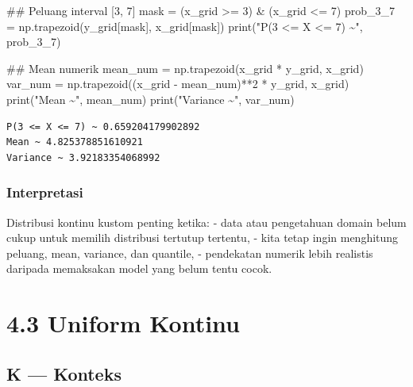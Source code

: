 \documentclass[
  letterpaper,
  DIV=11,
  numbers=noendperiod]{scrreprt}
\newenvironment{Shaded}{\begin{snugshade}}{\end{snugshade}}
\newcommand{\BuiltInTok}[1]{\textcolor[rgb]{0.00,0.23,0.31}{#1}}
\newcommand{\CommentTok}[1]{\textcolor[rgb]{0.37,0.37,0.37}{#1}}
\newcommand{\DecValTok}[1]{\textcolor[rgb]{0.68,0.00,0.00}{#1}}
\newcommand{\NormalTok}[1]{\textcolor[rgb]{0.00,0.23,0.31}{#1}}
\newcommand{\OperatorTok}[1]{\textcolor[rgb]{0.37,0.37,0.37}{#1}}
\newcommand{\StringTok}[1]{\textcolor[rgb]{0.13,0.47,0.30}{#1}}
\begin{document}
\begin{Shaded}
\begin{Highlighting}[]
\CommentTok{\#\# Peluang interval [3, 7]}
\NormalTok{mask }\OperatorTok{=}\NormalTok{ (x\_grid }\OperatorTok{\textgreater{}=} \DecValTok{3}\NormalTok{) }\OperatorTok{\&}\NormalTok{ (x\_grid }\OperatorTok{\textless{}=} \DecValTok{7}\NormalTok{)}
\NormalTok{prob\_3\_7 }\OperatorTok{=}\NormalTok{ np.trapezoid(y\_grid[mask], x\_grid[mask])}
\BuiltInTok{print}\NormalTok{(}\StringTok{"P(3 \textless{}= X \textless{}= 7) \textasciitilde{}"}\NormalTok{, prob\_3\_7)}

\CommentTok{\#\# Mean numerik}
\NormalTok{mean\_num }\OperatorTok{=}\NormalTok{ np.trapezoid(x\_grid }\OperatorTok{*}\NormalTok{ y\_grid, x\_grid)}
\NormalTok{var\_num }\OperatorTok{=}\NormalTok{ np.trapezoid((x\_grid }\OperatorTok{{-}}\NormalTok{ mean\_num)}\OperatorTok{**}\DecValTok{2} \OperatorTok{*}\NormalTok{ y\_grid, x\_grid)}
\BuiltInTok{print}\NormalTok{(}\StringTok{"Mean \textasciitilde{}"}\NormalTok{, mean\_num)}
\BuiltInTok{print}\NormalTok{(}\StringTok{"Variance \textasciitilde{}"}\NormalTok{, var\_num)}
\end{Highlighting}
\end{Shaded}

\begin{verbatim}
P(3 <= X <= 7) ~ 0.659204179902892
Mean ~ 4.825378851610921
Variance ~ 3.92183354068992
\end{verbatim}

\subsubsection{Interpretasi}\label{interpretasi-10}

Distribusi kontinu kustom penting ketika: - data atau pengetahuan domain
belum cukup untuk memilih distribusi tertutup tertentu, - kita tetap
ingin menghitung peluang, mean, variance, dan quantile, - pendekatan
numerik lebih realistis daripada memaksakan model yang belum tentu
cocok.

\section{4.3 Uniform Kontinu}\label{uniform-kontinu}

\subsection{K --- Konteks}\label{k-konteks-20}
\end{document}
